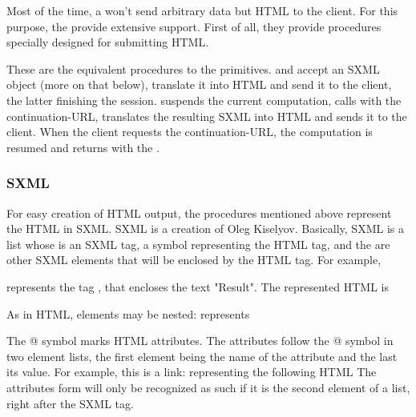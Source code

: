 Most of the time, a \surflet won't send arbitrary data but HTML to the
client.  For this purpose, the \surflets provide extensive support.
First of all, they provide procedures specially designed for
submitting HTML.

\begin{desc}
  These are the equivalent procedures to the  primitives.
   and  accept an SXML object (more
  on that below), translate it into HTML and send it to the client,
  the latter finishing the session.   suspends
  the current computation, calls  with the
  continuation-URL, translates the resulting SXML into HTML and sends
  it to the client.  When the client requests the continuation-URL,
  the computation is resumed and  returns with
  the .
\end{desc}


\subsubsection{SXML}

For easy creation of HTML output, the  procedures
mentioned above represent the HTML in SXML.  SXML is a creation of
Oleg Kiselyov.  Basically, SXML is a list whose  is an SXML
tag, a symbol representing the HTML tag, and the  are other
SXML elements that will be enclosed by the HTML tag.  For example,

represents the tag , that encloses the text "Result".  The
represented HTML is

As in HTML, elements may be nested:
represents

The @ symbol marks HTML attributes.  The attributes follow the @
symbol in two element lists, the first element being the name of the
attribute and the last its value.  For example, this is a link:
representing the following HTML
  The
attributes form will only be recognized as such if it is the second
element of a list, right after the SXML tag.  

